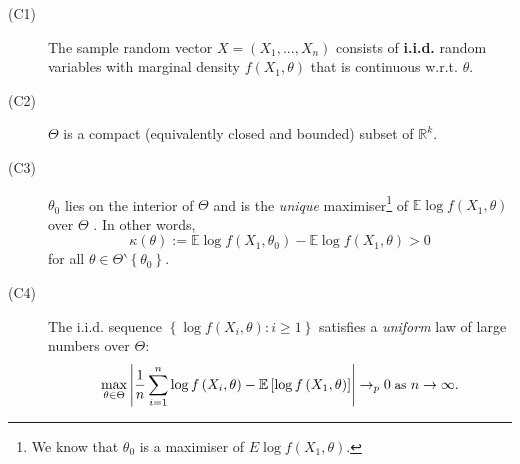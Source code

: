 \documentclass[notes=show]{beamer}
\begin{document}
\begin{frame}%



\begin{description}
\item[(C1)] The sample random vector $X=\left( X_{1},...,X_{n}\right) $
consists of \textbf{i.i.d.} random variables with marginal density $f\left(
X_{1},\theta \right) $ that is continuous w.r.t. $\theta $.

\item[(C2)] $\Theta $ is a compact (equivalently closed and bounded) subset
of $\mathbb{R}^{k}$.

\item[(C3)] $\theta _{0}$ lies on the interior of $\Theta $ and is the 
\textit{unique} maximiser\footnote{%
We know that $\theta _{0}$ is a maximiser of $E\log f\left( X_{1},\theta
\right) $.} of $\mathbb{E}\log f\left( X_{1},\theta \right) $ over $\Theta $%
. In other words,%
\begin{equation}
\kappa \left( \theta \right) :=\mathbb{E}\log f\left( X_{1},\theta
_{0}\right) -\mathbb{E}\log f\left( X_{1},\theta \right) >0  \label{kappa}
\end{equation}%
for all $\theta \in \Theta \backprime \left\{ \theta _{0}\right\} $.

\item[(C4)] The i.i.d. sequence $\left\{ \log f\left( X_{i},\theta \right)
:i\geq 1\right\} $ satisfies a \textit{uniform} law of large numbers over $%
\Theta $:%
\begin{equation}
\max_{\theta \in \Theta }\left\vert \frac{1}{n}\sum_{i=1}^{n}\log f\left(
X_{i},\theta \right) -\mathbb{E}\left[ \log f\left( X_{1},\theta \right) %
\right] \right\vert \rightarrow _{p}0\;\text{{\small as} }n\rightarrow
\infty .  \label{ULLNc}
\end{equation}
\end{description}

\end{frame}%
\end{document}
